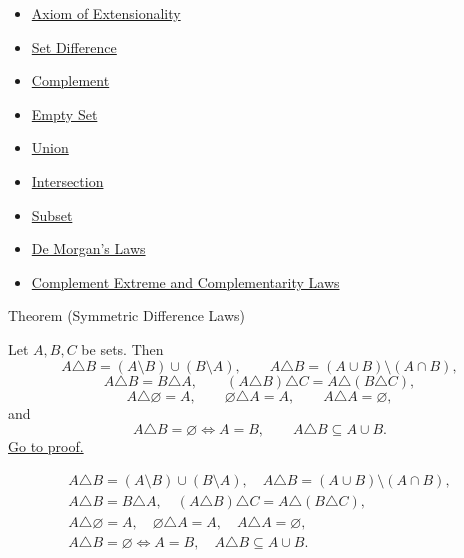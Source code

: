 \begin{dependencies}
\begin{itemize}
  \item \hyperref[ax:extensionality]{Axiom of Extensionality}
  \item \hyperref[def:set-difference]{Set Difference}
  \item \hyperref[def:complement]{Complement}
  \item \hyperref[def:empty-set]{Empty Set}
  \item \hyperref[def:union]{Union}
  \item \hyperref[def:intersection]{Intersection}
  \item \hyperref[def:subset]{Subset}
  \item \hyperref[thm:de-morgan]{De Morgan's Laws}
  \item \hyperref[thm:complement-laws]{Complement Extreme and Complementarity Laws}
\end{itemize}
\end{dependencies}

\begin{theorembox}{Theorem (Symmetric Difference Laws)}
\begin{theorem}\label{thm:symmetric-difference-laws}
Let $A,B,C$ be sets. Then
\[
A\triangle B=(A\setminus B)\cup(B\setminus A),
\qquad
A\triangle B=(A\cup B)\setminus(A\cap B),
\]
\[
A\triangle B=B\triangle A,
\qquad
(A\triangle B)\triangle C=A\triangle(B\triangle C),
\]
\[
A\triangle\varnothing=A,
\qquad
\varnothing\triangle A=A,
\qquad
A\triangle A=\varnothing,
\]
and
\[
A\triangle B=\varnothing\iff A=B,
\qquad
A\triangle B\subseteq A\cup B.
\]
\hyperref[prf:symmetric-difference-laws]{Go to proof.}
\end{theorem}
\end{theorembox}

\begin{remark*}
\[
\begin{gathered}
A\triangle B=(A\setminus B)\cup(B\setminus A),\quad
A\triangle B=(A\cup B)\setminus(A\cap B),\\
A\triangle B=B\triangle A,\quad
(A\triangle B)\triangle C=A\triangle(B\triangle C),\\
A\triangle\varnothing=A,\quad
\varnothing\triangle A=A,\quad
A\triangle A=\varnothing,\\
A\triangle B=\varnothing\iff A=B,\quad
A\triangle B\subseteq A\cup B.
\end{gathered}
\]
\end{remark*}

